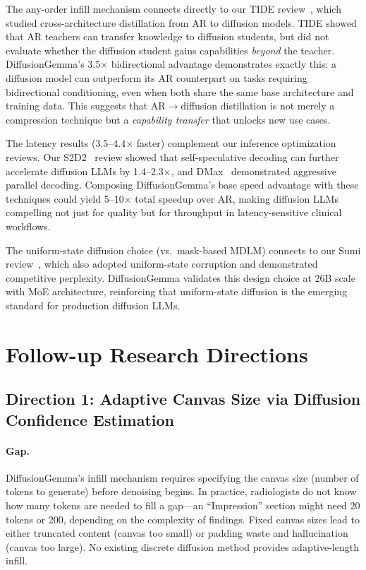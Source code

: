 \documentclass[11pt,a4paper]{article}
\begin{document}
The any-order infill mechanism connects directly to our TIDE review~\cite{tide2026}, which studied cross-architecture distillation from AR to diffusion models. TIDE showed that AR teachers can transfer knowledge to diffusion students, but did not evaluate whether the diffusion student gains capabilities \emph{beyond} the teacher. DiffusionGemma's 3.5$\times$ bidirectional advantage demonstrates exactly this: a diffusion model can outperform its AR counterpart on tasks requiring bidirectional conditioning, even when both share the same base architecture and training data. This suggests that AR$\to$diffusion distillation is not merely a compression technique but a \emph{capability transfer} that unlocks new use cases.

The latency results (3.5--4.4$\times$ faster) complement our inference optimization reviews. Our S2D2~\cite{s2d2_2026} review showed that self-speculative decoding can further accelerate diffusion LLMs by 1.4--2.3$\times$, and DMax~\cite{dmax2026} demonstrated aggressive parallel decoding. Composing DiffusionGemma's base speed advantage with these techniques could yield 5--10$\times$ total speedup over AR, making diffusion LLMs compelling not just for quality but for throughput in latency-sensitive clinical workflows.

The uniform-state diffusion choice (vs.\ mask-based MDLM) connects to our Sumi review~\cite{sumi2026}, which also adopted uniform-state corruption and demonstrated competitive perplexity. DiffusionGemma validates this design choice at 26B scale with MoE architecture, reinforcing that uniform-state diffusion is the emerging standard for production diffusion LLMs.

\section{Follow-up Research Directions}

\subsection{Direction 1: Adaptive Canvas Size via Diffusion Confidence Estimation}

\paragraph{Gap.} DiffusionGemma's infill mechanism requires specifying the canvas size (number of tokens to generate) before denoising begins. In practice, radiologists do not know how many tokens are needed to fill a gap---an ``Impression'' section might need 20 tokens or 200, depending on the complexity of findings. Fixed canvas sizes lead to either truncated content (canvas too small) or padding waste and hallucination (canvas too large). No existing discrete diffusion method provides adaptive-length infill.
\end{document}
